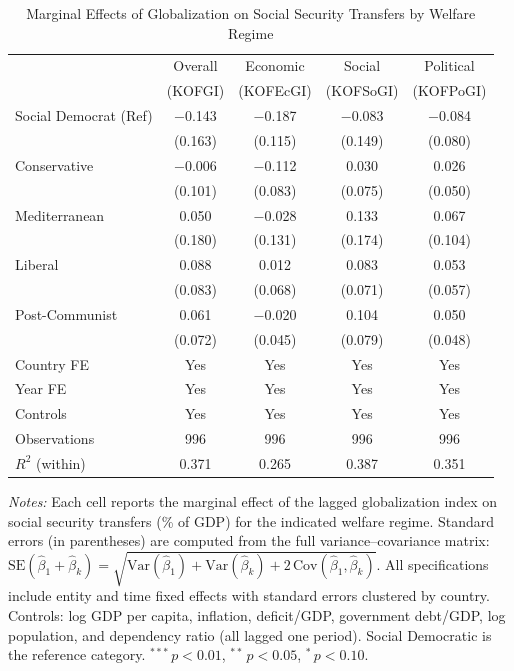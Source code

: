 \begin{table}[htbp]
\centering
\caption{Marginal Effects of Globalization on Social Security Transfers by Welfare Regime}
\label{tab:marginal_effects_consolidated}
\begin{tabular}{lcccc}
\toprule
 & Overall & Economic & Social & Political \\
 & (KOFGI) & (KOFEcGI) & (KOFSoGI) & (KOFPoGI) \\
\midrule
Social Democrat (Ref) & $-$0.143 & $-$0.187 & $-$0.083 & $-$0.084 \\
 & (0.163) & (0.115) & (0.149) & (0.080) \\
\addlinespace
Conservative & $-$0.006 & $-$0.112 & \phantom{$-$}0.030 & \phantom{$-$}0.026 \\
 & (0.101) & (0.083) & (0.075) & (0.050) \\
\addlinespace
Mediterranean & \phantom{$-$}0.050 & $-$0.028 & \phantom{$-$}0.133 & \phantom{$-$}0.067 \\
 & (0.180) & (0.131) & (0.174) & (0.104) \\
\addlinespace
Liberal & \phantom{$-$}0.088 & \phantom{$-$}0.012 & \phantom{$-$}0.083 & \phantom{$-$}0.053 \\
 & (0.083) & (0.068) & (0.071) & (0.057) \\
\addlinespace
Post-Communist & \phantom{$-$}0.061 & $-$0.020 & \phantom{$-$}0.104 & \phantom{$-$}0.050 \\
 & (0.072) & (0.045) & (0.079) & (0.048) \\
\midrule
Country FE & Yes & Yes & Yes & Yes \\
Year FE & Yes & Yes & Yes & Yes \\
Controls & Yes & Yes & Yes & Yes \\
Observations & 996 & 996 & 996 & 996 \\
$R^2$ (within) & 0.371 & 0.265 & 0.387 & 0.351 \\
\bottomrule
\end{tabular}
\begin{tablenotes}
\small
\item \textit{Notes:} Each cell reports the marginal effect of the lagged globalization index on social security transfers (\% of GDP) for the indicated welfare regime. Standard errors (in parentheses) are computed from the full variance--covariance matrix: $\mathrm{SE}(\hat\beta_1 + \hat\beta_k) = \sqrt{\mathrm{Var}(\hat\beta_1) + \mathrm{Var}(\hat\beta_k) + 2\,\mathrm{Cov}(\hat\beta_1, \hat\beta_k)}$. All specifications include entity and time fixed effects with standard errors clustered by country. Controls: log GDP per capita, inflation, deficit/GDP, government debt/GDP, log population, and dependency ratio (all lagged one period). Social Democratic is the reference category. $^{***}\,p<0.01$, $^{**}\,p<0.05$, $^{*}\,p<0.10$.
\end{tablenotes}
\end{table}